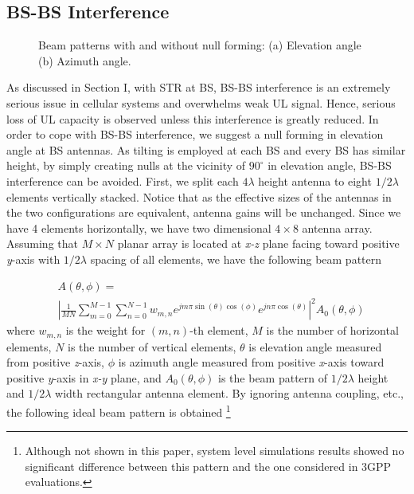 \documentclass[twocolumn]{IEEEtran}
\begin{document}
\subsection{BS-BS Interference}

\begin{figure}[!t]


\caption{Beam patterns with and without null forming: (a) Elevation
angle (b) Azimuth angle. \label{beam} }

\end{figure}

As discussed in Section I, with STR at BS, BS-BS interference is an
extremely serious issue in cellular systems and overwhelms weak UL
signal. Hence, serious loss of UL capacity is observed unless this
interference is greatly reduced. In order to cope with BS-BS
interference, we suggest a null forming in elevation angle at BS
antennas. As tilting is employed at each BS and every BS has similar
height, by simply creating nulls at the vicinity of $90^{\circ}$ in
elevation angle, BS-BS interference can be avoided. First, we split
each $4 \lambda$ height antenna to eight $1/2 \lambda$ elements
vertically stacked. Notice that as the effective sizes of the
antennas in the two configurations are equivalent, antenna gains
will be unchanged. Since we have 4 elements horizontally, we have
two dimensional $4 \times 8$ antenna array. Assuming that $M \times
N$ planar array is located at \textit{x-z} plane facing toward
positive \textit{y}-axis with $1/2 \lambda$ spacing of all elements,
we have the following beam pattern

\begin{align} \label{antpattern}
&A(\theta, \phi)= \nonumber\\
&\left |\frac{1}{MN} \sum_{m=0}^{M-1} \sum_{n=0}^{N-1} w_{m,n}
e^{jm\pi \sin (\theta) \cos(\phi)} e^{jn\pi \cos (\theta) }  \right
|^2 A_{0}(\theta, \phi)
\end{align}
where $w_{m,n}$ is the weight for $(m,n)$-th element, $M$ is the
number of horizontal elements, $N$ is the number of vertical
elements, $\theta$ is elevation angle measured from positive
\textit{z}-axis, $\phi$ is azimuth angle measured from positive
\textit{x}-axis toward positive \textit{y}-axis in \textit{x-y}
plane, and $A_{0}(\theta, \phi)$ is the beam pattern of $1/2
\lambda$ height and $1/2 \lambda$ width rectangular antenna element.
By ignoring antenna coupling, etc., the following ideal beam pattern
is obtained \footnote{Although not shown in this paper, system level
simulations results showed no significant difference between this
pattern and the one considered in 3GPP evaluations.}
\end{document}

